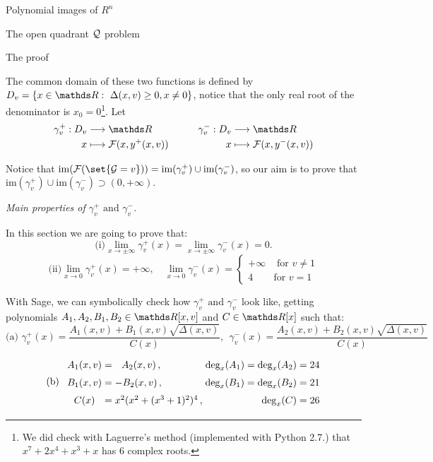 \documentclass[11pt, a4paper, english, twoside, notitlepage]{report}
\begin{document}
\begin{chapter}{Polynomial images of $R^n$}
\begin{section}{The open quadrant $\mathcal{Q}$ problem}
\begin{subsection}{The proof}
\begin{Proof}
			The common domain of these two functions is defined by $D_v=\{x \in \R :\ \Delta(x,v) \geq 0, x \neq 0\}$, notice that the only real root of the denominator is $x_0 = 0$\footnote{We did check with Laguerre's method (implemented with Python 2.7.) that $x^7 + 2x^4 + x^3 + x$ has 6 complex roots.}. Let
			$$\begin{matrix}
				\begin{aligned}
					\gamma_v^+: D_v & \longrightarrow \R\\
					x &\longmapsto \F(x,y^+(x,v))\\
					\end{aligned}
 				& \qquad
				\begin{aligned}
					\gamma_v^-:D_v & \longrightarrow \R\\
					x &\longmapsto \F(x,y^-(x,v))\\
				\end{aligned}
			\end{matrix}$$
			
			Notice that $\text{im}(\F(\set{\G = v})) = \text{im}(\gamma_v^+) \cup \text{im}(\gamma_v^-)$, so our aim is to prove that $\text{im}(\gamma_v^+) \cup \text{im}(\gamma_v^-) \supset (0, +\infty)$.
			
			\begin{center}
				 \emph{Main properties of $\gamma_v^+ \text{ and } \gamma_v^-$.}
			\end{center}
			
			In this section we are going to prove that:
			$$\text{(i)} \lim_{x\rightarrow \pm\infty}\gamma_v^+(x)=\lim_{x\rightarrow \pm\infty}\gamma_v^-(x)=0.$$
			$$\text{(ii)} \lim_{x\rightarrow 0}\gamma_v^+(x)=+\infty
				,\quad 
				\lim_{x\rightarrow 0}\gamma_v^-(x) =
				\left\{\begin{array}{ll}
					+\infty & \text{ for $v\neq 1$}\\
					4 & \text{for $v=1$}
				\end{array} \right.
			$$

			With Sage, we can symbolically check how $\gamma_v^+ \text{ and } \gamma_v^-$ look like, getting polynomials $A_1,A_2,B_1,B_2\in\R[x,v]$ and $C\in \R[x]$ such that:
			$$\text{(a) } \gamma_v^+(x)=\dfrac{A_1(x,v)+B_1(x,v)\sqrt{\Delta(x,v)}}{C(x)}, \ \ 
			\gamma_v^-(x)=\dfrac{A_2(x,v)+B_2(x,v)\sqrt{\Delta(x,v)}}{C(x)}$$
			$$\text{(b)}\ \ 
				\arraycolsep=1.4pt\def\arraystretch{1.5}
				\begin{array}{cclr}
					A_1(x, v) & = &\ \ A_2(x, v)\, , & \text{deg}_x(A_1) = \text{deg}_x(A_2) = 24\\
					B_1(x, v) & = & - B_2(x, v)\, , & \text{deg}_x(B_1) = \text{deg}_x(B_2) = 21\\
					C(x) & = & x^2(x^2+(x^3+1)^2)^4\, , & \text{deg}_x(C) = 26
				\end{array}
			$$
			

\end{Proof}
\end{subsection}
\end{section}
\end{chapter}
\end{document}

